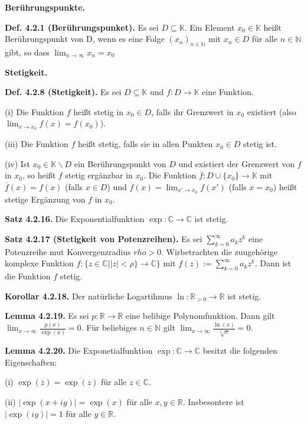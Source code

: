 \textbf{Berührungspunkte.}

\textbf{Def. 4.2.1 (Berührungspunket).} Es sei $D \subseteq \mathbb K$. Ein Element $x_0 \in \mathbb K$ heißt Berührungspunkt von D, wenn es eine Folge $(x_n)_{n \in \mathbb N}$ mit $x_n \in D$ für alle $n \in \mathbb N$ gibt, so dass $\lim_{n \rightarrow \infty} x_n = x_0$

\textbf{Stetigkeit.} 

\textbf{Def. 4.2.8 (Stetigkeit).} Es sei $D \subseteq \mathbb K$ und $f:D\rightarrow \mathbb K$ eine Funktion.

(i) Die Funktion $f$ heißt stetig in $x_0 \in D$, falls ihr Grenzwert in $x_0$ existiert (also $\lim_{x\rightarrow x_0} f(x) = f(x_0)$).

(iii) Die Funktion $f$ heißt stetig, falls sie in allen Punkten $x_0\in D$ stetig ist.

(iv) Ist $x_0 \in \mathbb K \backslash D$ ein Berührungspunkt von $D$ und existiert der Grenzwert von $f$ in $x_0$, so heißt $f$ stetig ergänzbar in $x_0$. Die Funktion $\overline f:D \cup \{x_0\} \rightarrow \mathbb K$ mit $\overline f(x)=f(x)$ (falls $x\in D$) und $\overline f(x)=\lim_{x'\rightarrow x_0}f(x')$ (falls $x=x_0$) heißt stetige Ergänzung von $f$ in $x_0$.

\textbf{Satz 4.2.16.} Die Exponentialfunktion $\exp :\mathbb C \rightarrow \mathbb C$ ist stetig.

\textbf{Satz 4.2.17 (Stetigkeit von Potenzreihen).} Es sei $\sum_{k=0}^\infty a_k z^k$ eine Potenzreihe mut Konvergenzradius $rho > 0$. Wirbetrachten die zuugehörige komplexe Funktion $f : \{ z \in \mathbb C \vert \vert z \vert < \rho \} \rightarrow \mathbb C\}$ mit $f(z) := \sum_{k=0}^\infty a_k z^k$. Dann ist die Funktion $f$ stetig.

\textbf{Korollar 4.2.18.} Der natürliche Logartihmus $\ln : \mathbb R_{>0} \rightarrow \mathbb R$ ist stetig.

\textbf{Lemma 4.2.19.} Es sei $p:\mathbb R \rightarrow \mathbb R$ eine belibige Polynomfunktion. Dann gilt $\lim_{x\rightarrow \infty} \frac{p(x)}{\exp(x)}=0$. Für beliebiges $n\in \mathbb N$ gilt $\lim_{x\rightarrow \infty} \frac{\ln(x)}{\sqrt[n]{x}} = 0$.

\textbf{Lemma 4.2.20.} Die Exponetialfunktion $\exp : \mathbb C \rightarrow \mathbb C$ besitzt die folgenden Eigenschaften:

(i) $\exp(\overline z) = \overline{\exp(z)}$ für alle $z \in \mathbb C$.

(ii) $\vert \exp(x+iy) \vert = \exp (x)$ für alle $x,y \in \mathbb R$. Insbesontere ist $\vert\exp(iy)\vert =1$ für alle $y \in \mathbb R$.

